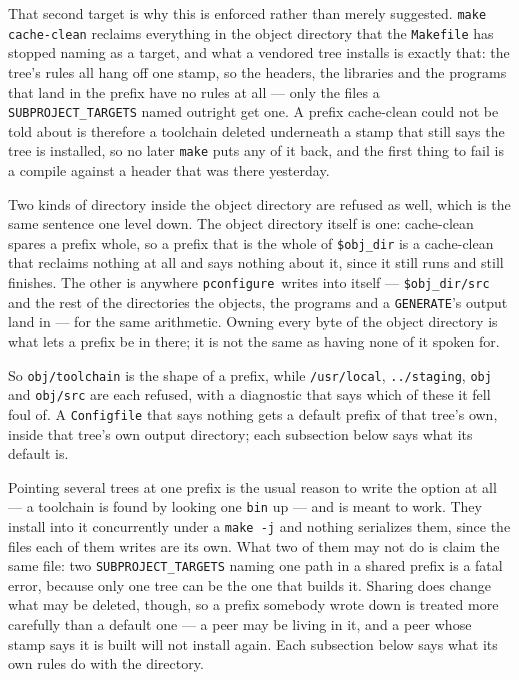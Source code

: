 \documentclass{article}
\newcommand{\pconfigure}{\texttt{pconfigure}}
\begin{document}
That second target is why this is enforced rather than merely
suggested.  \texttt{make cache-clean} reclaims everything in the
object directory that the \texttt{Makefile}
has stopped naming as a target, and what a vendored tree installs is
exactly that: the tree's rules all hang off one stamp, so the headers,
the libraries and the programs that land in the prefix have no rules
at all --- only the files a \texttt{SUBPROJECT\_TARGETS} named outright
get one.  A prefix cache-clean could not be told about is therefore a
toolchain deleted underneath a stamp that still says the tree is
installed, so no later \texttt{make} puts any of it back, and the
first thing to fail is a compile against a header that was there
yesterday.

Two kinds of directory inside the object directory are refused as
well, which is the same sentence one level down.  The object directory
itself is one: cache-clean spares a prefix whole, so a prefix that is
the whole of \texttt{\$obj\_dir} is a cache-clean that reclaims
nothing at all and says nothing about it, since it still runs and
still finishes.  The other is anywhere \pconfigure\ writes into
itself --- \texttt{\$obj\_dir/src} and the rest of the directories the
objects, the programs and a \texttt{GENERATE}'s output land in --- for
the same arithmetic.  Owning every byte of the object directory is
what lets a prefix be in there; it is not the same as having none of
it spoken for.

So \texttt{obj/toolchain} is the shape of a prefix, while
\texttt{/usr/local}, \texttt{../staging}, \texttt{obj} and
\texttt{obj/src} are each refused, with a diagnostic that says which
of these it fell foul of.  A \texttt{Configfile} that says nothing
gets a default prefix of that tree's own, inside that tree's own
output directory; each subsection below says what its default is.

Pointing several trees at one prefix is the usual reason to write the
option at all --- a toolchain is found by looking one \texttt{bin} up
--- and is meant to work.  They install into it concurrently under a
\texttt{make -j} and nothing serializes them, since the files each of
them writes are its own.  What two of them may not do is claim the
same file: two \texttt{SUBPROJECT\_TARGETS} naming one path in a
shared prefix is a fatal error, because only one tree can be the one
that builds it.  Sharing does change what may be deleted, though, so a
prefix somebody wrote down is treated more carefully than a default
one --- a peer may be living in it, and a peer whose stamp says it is
built will not install again.  Each subsection below says what its own
rules do with the directory.
\end{document}
